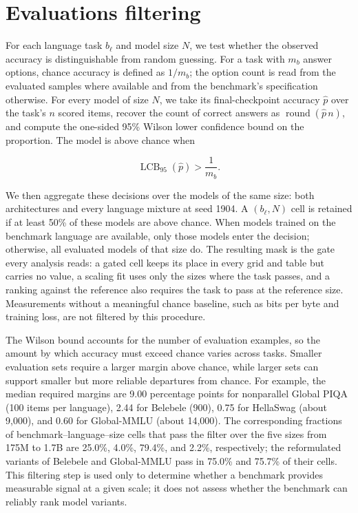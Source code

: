 \section{Evaluations filtering}
\label{app:results-filtering}

For each language task $b_\ell$ and model size $N$, we test whether the observed accuracy is distinguishable from random guessing.
For a task with $m_b$ answer options, chance accuracy is defined as $1/m_b$; the option count is read from the evaluated samples where available and from the benchmark's specification otherwise.
For every model of size $N$, we take its final-checkpoint accuracy $\hat{p}$ over the task's $n$ scored items, recover the count of correct answers as $\operatorname{round}(\hat{p}\,n)$, and compute the one-sided 95\% Wilson lower confidence bound on the proportion.
The model is above chance when

\[
\operatorname{LCB}_{95}(\hat{p}) > \frac{1}{m_b}.
\]

We then aggregate these decisions over the models of the same size: both architectures and every language mixture at seed 1904.
A $(b_\ell, N)$ cell is retained if at least 50\% of these models are above chance.
When models trained on the benchmark language are available, only those models enter the decision; otherwise, all evaluated models of that size do.
The resulting mask is the gate every analysis reads: a gated cell keeps its place in every grid and table but carries no value, a scaling fit uses only the sizes where the task passes, and a ranking against the reference also requires the task to pass at the reference size.
Measurements without a meaningful chance baseline, such as bits per byte and training loss, are not filtered by this procedure.

The Wilson bound accounts for the number of evaluation examples, so the amount by which accuracy must exceed chance varies across tasks.
Smaller evaluation sets require a larger margin above chance, while larger sets can support smaller but more reliable departures from chance.
For example, the median required margins are 9.00 percentage points for nonparallel Global PIQA (100 items per language), 2.44 for Belebele (900), 0.75 for HellaSwag (about 9,000), and 0.60 for Global-MMLU (about 14,000).
The corresponding fractions of benchmark--language--size cells that pass the filter over the five sizes from 175M to 1.7B are 25.0\%, 4.0\%, 79.4\%, and 2.2\%, respectively; the reformulated variants of Belebele and Global-MMLU pass in 75.0\% and 75.7\% of their cells.
This filtering step is used only to determine whether a benchmark provides measurable signal at a given scale; it does not assess whether the benchmark can reliably rank model variants.
